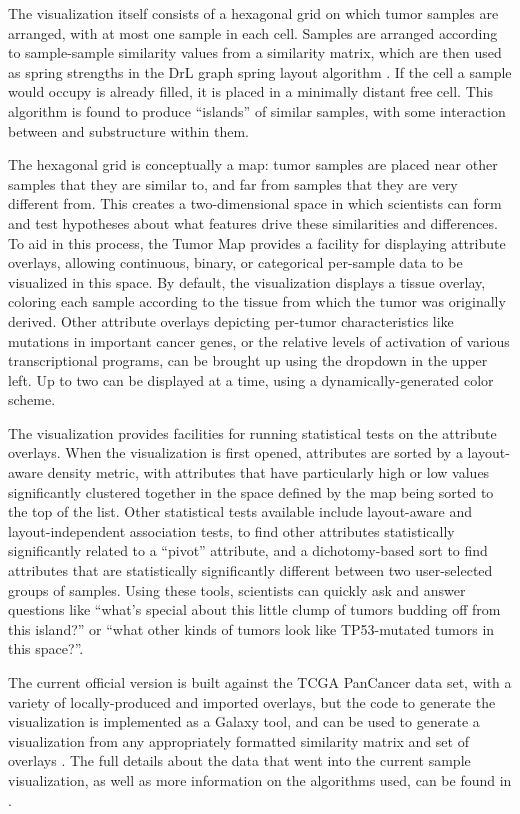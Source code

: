 \documentclass[11pt,proposal]{ucthesis}
\begin{document}
The visualization itself consists of a hexagonal grid on which tumor samples are arranged, with at most one sample in each cell. Samples are arranged according to sample-sample similarity values from a similarity matrix, which are then used as spring strengths in the DrL graph spring layout algorithm \cite{martin2008drl}. If the cell a sample would occupy is already filled, it is placed in a minimally distant free cell. This algorithm is found to produce ``islands'' of similar samples, with some interaction between and substructure within them.

The hexagonal grid is conceptually a map: tumor samples are placed near other samples that they are similar to, and far from samples that they are very different from. This creates a two-dimensional space in which scientists can form and test hypotheses about what features drive these similarities and differences. To aid in this process, the Tumor Map provides a facility for displaying attribute overlays, allowing continuous, binary, or categorical per-sample data to be visualized in this space. By default, the visualization displays a tissue overlay, coloring each sample according to the tissue from which the tumor was originally derived. Other attribute overlays depicting per-tumor characteristics like mutations in important cancer genes, or the relative levels of activation of various transcriptional programs, can be brought up using the dropdown in the upper left. Up to two can be displayed at a time, using a dynamically-generated color scheme.

The visualization provides facilities for running statistical tests on the attribute overlays. When the visualization is first opened, attributes are sorted by a layout-aware density metric, with attributes that have particularly high or low values significantly clustered together in the space defined by the map being sorted to the top of the list. Other statistical tests available include layout-aware and layout-independent association tests, to find other attributes statistically significantly related to a ``pivot'' attribute, and a dichotomy-based sort to find attributes that are statistically significantly different between two user-selected groups of samples. Using these tools, scientists can quickly ask and answer questions like ``what's special about this little clump of tumors budding off from this island?'' or ``what other kinds of tumors look like TP53-mutated tumors in this space?''.

The current official version is built against the TCGA PanCancer data set, with a variety of locally-produced and imported overlays, but the code to generate the visualization is implemented as a Galaxy tool, and can be used to generate a visualization from any appropriately formatted similarity matrix and set of overlays \cite{weinstein2013cancer,giardine2005galaxy}. The full details about the data that went into the current sample visualization, as well as more information on the algorithms used, can be found in \cite{novak2014ucsc}.
\end{document}
